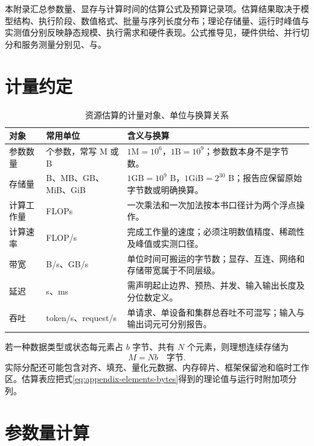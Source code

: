 \documentclass[../textbook.tex]{subfiles}
\begin{document}
\fi
{}

本附录汇总参数量、显存与计算时间的估算公式及预算记录项。估算结果取决于模型结构、执行阶段、数值格式、批量与序列长度分布；理论存储量、运行时峰值与实测值分别反映静态规模、执行需求和硬件表现。公式推导见，硬件供给、并行切分和服务测量分别见、与。

\section{计量约定}

\begin{table}[htbp]
\centering
\caption{资源估算的计量对象、单位与换算关系}\label{tab:appendix-resource-units}
\begin{tabularx}{\linewidth}{p{.22\linewidth}p{.28\linewidth}X}
\toprule
对象 & 常用单位 & 含义与换算\\\midrule
参数数量 & 个参数，常写 M 或 B & $1\mathrm{M}=10^6$，$1\mathrm{B}=10^9$；参数数本身不是字节数。\\
存储量 & B、MB、GB、MiB、GiB & $1\mathrm{GB}=10^9$ B，$1\mathrm{GiB}=2^{30}$ B；报告应保留原始字节数或明确换算。\\
计算工作量 & FLOPs & 一次乘法和一次加法按本书口径计为两个浮点操作。\\
计算速率 & FLOP/s & 完成工作量的速度；必须注明数值精度、稀疏性及峰值或实测口径。\\
带宽 & B/s、GB/s & 单位时间可搬运的字节数；显存、互连、网络和存储带宽属于不同层级。\\
延迟 & s、ms & 需声明起止边界、预热、并发、输入输出长度及分位数定义。\\
吞吐 & token/s、request/s & 单请求、单设备和集群总吞吐不可混写；输入与输出词元可分别报告。\\
\bottomrule
\end{tabularx}
\end{table}

若一种数据类型或状态每元素占 $b$ 字节、共有 $N$ 个元素，则理想连续存储为
\begin{equation}
 M=Nb\quad\text{字节}.
 \label{eq:appendix-elements-bytes}
\end{equation}
实际分配还可能包含对齐、填充、量化元数据、内存碎片、框架保留池和临时工作区。估算表应把式\eqref{eq:appendix-elements-bytes}得到的理论值与运行时附加项分列。

\section{参数量计算}
\end{document}
